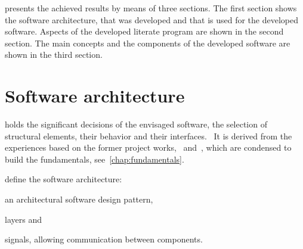 \documentclass[%
    a4paper,    %
    justified,  %
    nobib,      %
    openany     %
]{tufte-book}
\begin{document}
 presents the achieved results by means of three
sections. The first section shows the software architecture, that was developed
and that is used for the developed software. Aspects of the developed literate
program are shown in the second section. The main concepts and the components of
the developed software are shown in the third section.

%
%
%


\section{Software architecture}
\label{results:sec:software-architecture}

 holds the significant decisions of the
envisaged software, the selection of structural elements, their behavior and
their interfaces.~\cite{kruchten_rup_2003} It is derived from the experiences
based on the former project works,~
and~, which are condensed to build the
fundamentals, see~\ref{chap:fundamentals}.

 define the software architecture:
\begin{enumerate*}
  \item an architectural software design pattern,
  \item layers and
  \item signals, allowing communication between components.
\end{enumerate*}
\end{document}
